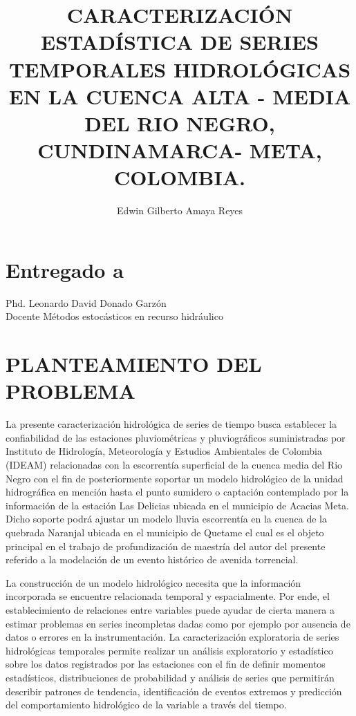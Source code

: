\documentclass{article} %
\begin{document}

\title{\textbf{CARACTERIZACI\'{O}N ESTAD\'{I}STICA DE SERIES TEMPORALES HIDROL\'{O}GICAS EN LA CUENCA ALTA - MEDIA DEL RIO NEGRO, CUNDINAMARCA- META, COLOMBIA.}}
\author{Edwin Gilberto Amaya Reyes}
\date{}

\maketitle

\section*{Entregado a}
Phd. Leonardo David Donado Garz\'{o}n \\
Docente M\'{e}todos estoc\'{a}sticos en recurso hidr\'{a}ulico 

\section*{PLANTEAMIENTO DEL PROBLEMA}
La presente caracterizaci\'{o}n hidrol\'{o}gica de series de tiempo busca establecer la confiabilidad de las estaciones pluviom\'{e}tricas y pluviogr\'{a}ficos suministradas por Instituto de Hidrolog\'{i}a, Meteorolog\'{i}a y Estudios Ambientales de Colombia (IDEAM) relacionadas con la escorrent\'{i}a superficial de la cuenca media del Rio Negro con el fin de posteriormente soportar un modelo hidrol\'{o}gico de la unidad hidrogr\'{a}fica en menci\'{o}n hasta el punto sumidero o captaci\'{o}n contemplado por la informaci\'{o}n de la estaci\'{o}n Las Delicias ubicada en el municipio de Acacias Meta. Dicho soporte podr\'{a} ajustar un modelo lluvia escorrent\'{i}a en la cuenca de la quebrada Naranjal ubicada en el municipio de Quetame el cual es el objeto principal en el trabajo de profundizaci\'{o}n de maestr\'{i}a del autor del presente referido a la modelaci\'{o}n de un evento hist\'{o}rico de avenida torrencial.

La construcci\'{o}n de un modelo hidrol\'{o}gico necesita que la informaci\'{o}n incorporada se encuentre relacionada temporal y espacialmente. Por ende, el establecimiento de relaciones entre variables puede ayudar de cierta manera a estimar problemas en series incompletas dadas como por ejemplo por ausencia de datos o errores en la instrumentaci\'{o}n. La caracterizaci\'{o}n exploratoria de series hidrol\'{o}gicas temporales permite realizar un an\'{a}lisis exploratorio y estad\'{i}stico sobre los datos registrados por las estaciones con el fin de definir momentos estad\'{i}sticos, distribuciones de probabilidad y an\'{a}lisis de series que permitir\'{a}n describir patrones de tendencia, identificaci\'{o}n de eventos extremos y predicci\'{o}n del comportamiento hidrol\'{o}gico de la variable a trav\'{e}s del tiempo. 
\end{document}
